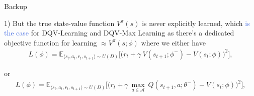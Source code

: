 \documentclass{beamer}
\begin{document}
\begin{frame}{Backup}

	1) But the true state-value function $V^{\pi}(s)$ is never explicitly learned, which \textcolor{RoyalBlue}{is the case} for DQV-Learning and DQV-Max Learning as there's a dedicated objective function for learning $\approx V^{\pi}(s;\phi)$ where we either have
	\bigskip
	\begin{multline*}
			L(\phi) = \mathds{E}_{\langle s_{t},a_{t},r_{t},s_{t+1}\rangle\sim U(D)} \bigg[\big(r_{t} + \gamma \: V(s_{t+1};\phi^{-}) - V(s_{t}; \phi)\big)^{2}\bigg],
		\end{multline*}

	\bigskip
	or
	\begin{multline*}
		L(\phi) = \mathds{E}_{\langle s_{t},a_{t},r_{t},s_{t+1}\rangle\sim U(D)} \bigg[\big(r_{t} + \gamma \: \underset{a\in \mathcal{A}}{\max}\: Q(s_{t+1}, a; \theta^{-}) - V(s_{t}; \phi)\big)^{2}\bigg],
	\end{multline*}

\end{frame}
\end{document}

